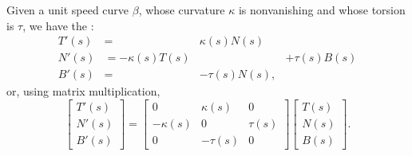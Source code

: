 \begin{theorem}
Given a unit speed curve $\beta$, whose curvature $\kappa$ is
nonvanishing and whose torsion is $\tau$, we have the :
\begin{subequations}
  \begin{alignat}{2}
    T'(s) &=                & \kappa(s)N(s) & \\
    N'(s) &= -\kappa(s)T(s) &               & +\tau(s)B(s)\\
    B'(s) &=                & -\tau(s)N(s), &
  \end{alignat}
\end{subequations}
or, using matrix multiplication,
\begin{equation}
\begin{bmatrix}T'(s)\\ N'(s)\\ B'(s)\end{bmatrix}
=
\begin{bmatrix}
  0 & \kappa(s) & 0\\
  -\kappa(s) & 0 & \tau(s)\\
  0 & -\tau(s) & 0
\end{bmatrix}
\begin{bmatrix}T(s)\\ N(s)\\ B(s)\end{bmatrix}.
\end{equation}
\end{theorem}

